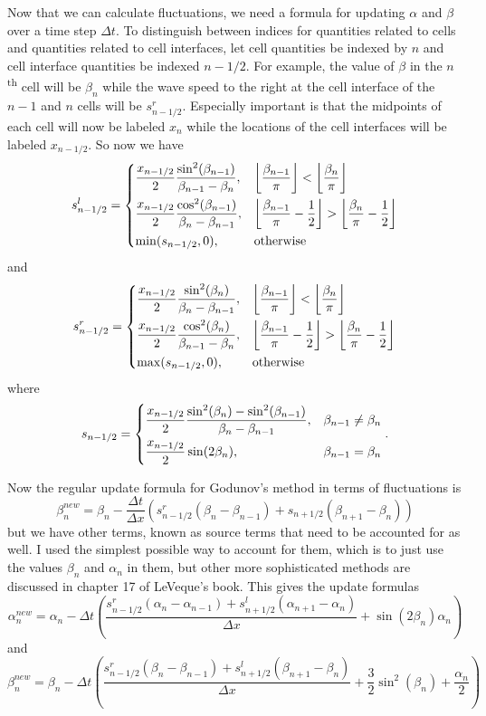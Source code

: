 \documentclass[12pt]{article}
\begin{document}
Now that we can calculate fluctuations, we need a formula for updating $\alpha$ and
$\beta$ over a time step $\Delta t$. To distinguish between indices for quantities
related to cells and quantities related to cell interfaces, let cell quantities be
indexed by $n$ and cell interface quantities be indexed $n-1/2$. For example, the value
of $\beta$ in the $n$\textsuperscript{th} cell will be $\beta_n$ while the wave speed to
the right at the cell interface of the $n-1$ and $n$ cells will be $s_{n-1/2}^r$.
Especially important is that the midpoints of each cell will now be labeled $x_n$ while
the locations of the cell interfaces will be labeled $x_{n-1/2}$. So now we have
\[ s_{n-1/2}^l = \begin{dcases}
    \frac{x_{n-1/2}}{2} \frac{\sin^2(\beta_{n-1})}{\beta_{n-1} - \beta_n}, &
    \left\lfloor \frac{\beta_{n-1}}{\pi} \right\rfloor < \left\lfloor
    \frac{\beta_n}{\pi} \right\rfloor \\
    \frac{x_{n-1/2}}{2} \frac{\cos^2(\beta_{n-1})}{\beta_n - \beta_{n-1}}, &
    \left\lfloor \frac{\beta_{n-1}}{\pi} - \frac{1}{2} \right\rfloor  > \left\lfloor
    \frac{\beta_n}{\pi} - \frac{1}{2} \right\rfloor \\
    \min(s_{n-1/2}, 0), & \textrm{otherwise}
\end{dcases} \]
and
\[ s_{n-1/2}^r = \begin{dcases}
    \frac{x_{n-1/2}}{2} \frac{\sin^2(\beta_n)}{\beta_n - \beta_{n-1}}, & \left\lfloor
    \frac{\beta_{n-1}}{\pi} \right\rfloor < \left\lfloor \frac{\beta_n}{\pi}
    \right\rfloor \\
    \frac{x_{n-1/2}}{2} \frac{\cos^2(\beta_n)}{\beta_{n-1} - \beta_n}, & \left\lfloor
    \frac{\beta_{n-1}}{\pi} - \frac{1}{2} \right\rfloor  > \left\lfloor
    \frac{\beta_n}{\pi} - \frac{1}{2} \right\rfloor \\
    \max(s_{n-1/2}, 0), & \textrm{otherwise}
\end{dcases} \]
where
\[ s_{n-1/2} = \begin{dcases}
    \frac{x_{n-1/2}}{2} \frac{\sin^2(\beta_n) - \sin^2(\beta_{n-1})}{\beta_n -
    \beta_{n-1}}, & \beta_{n-1} \ne \beta_n \\
    \frac{x_{n-1/2}}{2} \sin(2\beta_n), & \beta_{n-1} = \beta_n
\end{dcases}. \]

Now the regular update formula for Godunov's method in terms of fluctuations is
\[ \beta_n^{new} = \beta_n - \frac{\Delta t}{\Delta x} (s_{n-1/2}^r (\beta_n -
\beta_{n-1}) + s_{n+1/2} (\beta_{n+1} - \beta_n) ) \]
but we have other terms, known as source terms that need to be accounted for as well. I
used the simplest possible way to account for them, which is to just use the values
$\beta_n$ and $\alpha_n$ in them, but other more sophisticated methods are discussed
in chapter 17 of LeVeque's book. This gives the update formulas
\[ \alpha_n^{new} = \alpha_n - \Delta t \left( \frac{s_{n-1/2}^r (\alpha_n -
\alpha_{n-1}) + s_{n+1/2}^l (\alpha_{n+1} - \alpha_n)}{\Delta x} +
\sin(2\beta_n)\alpha_n \right) \]
and
\[ \beta_n^{new} = \beta_n - \Delta t \left( \frac{s_{n-1/2}^r (\beta_n - \beta_{n-1}) +
s_{n+1/2}^l (\beta_{n+1} - \beta_n)}{\Delta x} + \frac{3}{2}\sin^2(\beta_n) +
\frac{\alpha_n}{2} \right) \]
\end{document}
